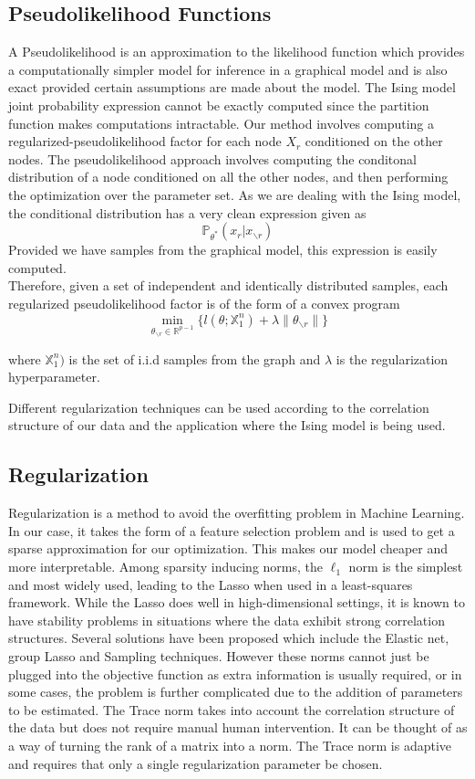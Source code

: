 \documentclass[11pt]{article}
\begin{document}
\subsection{Pseudolikelihood Functions}

A Pseudolikelihood is an approximation to the likelihood function which provides a computationally simpler model for inference in a graphical model and is also exact provided certain assumptions are made about the model. 
The Ising model joint probability expression cannot be exactly computed since the partition function makes computations intractable.
Our method involves computing a regularized-pseudolikelihood factor for each node $X_r$ conditioned on the other nodes.
The pseudolikelihood approach involves computing the conditonal distribution of a node conditioned on all the other nodes, and then performing the optimization over the parameter set.
As we are dealing with the Ising model, the conditional distribution has a very clean expression given as 
$$ \mathbb{P_{\theta^*}}( x_r | x_{\backslash r})  $$ 
Provided we have samples from the graphical model, this expression is easily computed.\\
Therefore, given a set of independent and identically distributed samples,  each regularized pseudolikelihood factor is of the form of a convex program 
$$ \min_{\theta_{\backslash r} \in \mathbb{R}^{p-1}} \{ l(\theta; \mathbb{X}^n_1) + \lambda \|{ \theta_{\backslash r} }\| \} $$

where $\mathbb{X}^n_1)$ is the set of i.i.d samples from the graph and $\lambda$ is the regularization hyperparameter. 

Different regularization techniques can be used according to the correlation structure of our data and the application where the Ising model is being used.

\subsection{Regularization}

Regularization is a method to avoid the overfitting problem in Machine Learning. 
In our case, it takes the form of a feature selection problem and is used to get a sparse approximation for our optimization. 
This makes our model cheaper and more interpretable. 
Among sparsity inducing norms, the $\ell_1$ norm is the simplest and most widely used, leading to the Lasso when used in a least-squares framework.
While the Lasso does well in high-dimensional settings, it is known to have stability problems in situations where the data exhibit strong correlation structures. 
Several solutions have been proposed which include the Elastic net, group Lasso and Sampling techniques. 
However these norms cannot just be plugged into the objective function as extra information is usually required, or in some cases, the problem is further complicated due to the addition of parameters to be estimated. 
The Trace norm takes into account the correlation structure of the data but does not require manual human intervention. 
It can be thought of as a way of turning the rank of a matrix into a norm. The Trace norm is adaptive and requires that only a single regularization parameter be chosen. 	
\end{document}

